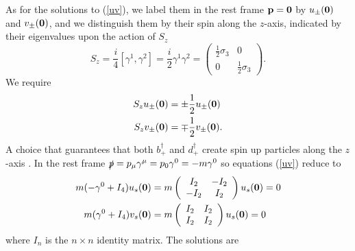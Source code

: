 As for the solutions to (\ref{uv}), we label them in the rest frame $\vb{p}=\vb{0}$ by $u_{\pm}(\vb{0})$ and $v_{\pm}(\vb{0})$, and we distinguish  them by their spin along the $z$-axis, indicated by their eigenvalues upon the action of $S_z$
\begin{equation}
S_{z}=\frac{i}{4}\left[\gamma^{1}, \gamma^{2}\right]=\frac{i}{2} \gamma^{1} \gamma^{2}=\left(\begin{array}{cc}
\frac{1}{2} \sigma_{3} & 0 \\
0 & \frac{1}{2} \sigma_{3}
\end{array}\right).
\end{equation}
We require 
\begin{equation}
    \begin{aligned}
         S_z u_{\pm}(\vb{0})&=\pm\frac{1}{2}u_{\pm}(\vb{0})\\
         S_z v_{\pm}(\vb{0})&=\mp\frac{1}{2}v_{\pm}(\vb{0}).
    \end{aligned}
\end{equation}
A choice that guarantees that both $b^\dagger_{+}$ and $d^\dagger_{+}$ create spin up particles along the $z$-axis \cite{srednicki2007quantum}. In the rest frame $\slashed{p}=p_\mu\gamma^\mu=p_0\gamma^0=-m\gamma^0$ so equations (\ref{uv}) reduce to
\begin{equation}
\begin{aligned}
    m(-\gamma^0+I_4)u_s(\vb{0})&=m\left(\begin{array}{cc}
I_2 & -I_2 \\
-I_2 & I_2
\end{array}\right)u_s(\vb{0})=0\\
    m(\gamma^0+I_4)v_s(\vb{0})&=m\left(\begin{array}{cc}
I_2 & I_2 \\
I_2 & I_2
\end{array}\right)u_s(\vb{0})=0
\end{aligned}
\end{equation}
where $I_n$ is the $n\times n$ identity matrix. The solutions are
